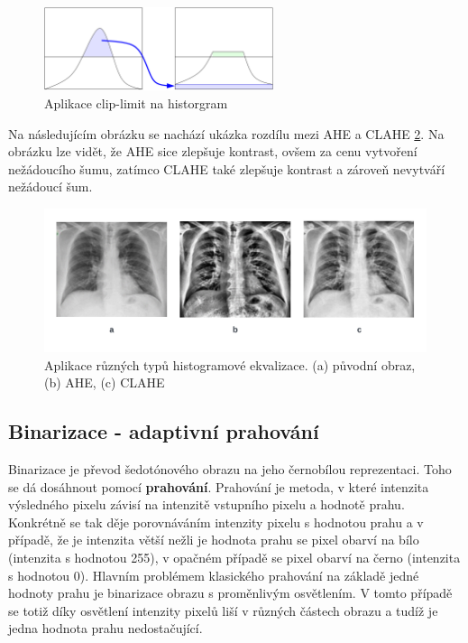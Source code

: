 \begin{figure}[h]
	\centering
	\includegraphics[width=0.6\textwidth]{obrazky/clip-limit.png}
	\caption{Aplikace clip-limit na historgram \cite{clip-limit}}
	\label{clip-limit}
\end{figure}

Na následujícím obrázku se nachází ukázka rozdílu mezi AHE a CLAHE \ref{CLAHEvsAHE}. Na obrázku lze vidět, že AHE sice zlepšuje kontrast, ovšem za cenu vytvoření nežádoucího šumu, zatímco CLAHE také zlepšuje kontrast a zároveň nevytváří nežádoucí šum.

\newpage
\begin{figure}[h]
	\centering
	\includegraphics[width=1\textwidth]{obrazky/CLAHEvsAHE.png}
	\caption{Aplikace různých typů histogramové ekvalizace. (a) původní obraz, (b) AHE, (c) CLAHE \cite{9563980}}
	\label{CLAHEvsAHE}
\end{figure}


\subsection{Binarizace - adaptivní prahování}
\label{adaptivetresh_chapter}
Binarizace je převod šedotónového obrazu na jeho černobílou reprezentaci. Toho se dá dosáhnout pomocí \textbf{prahování}. Prahování je metoda, v které intenzita výsledného pixelu závisí na intenzitě vstupního pixelu a hodnotě prahu. Konkrétně se tak děje porovnáváním intenzity pixelu s hodnotou prahu a v případě, že je intenzita větší nežli je hodnota prahu se pixel obarví na bílo (intenzita s hodnotou 255), v opačném případě se pixel obarví na černo (intenzita s hodnotou 0). Hlavním problémem klasického prahování na základě jedné hodnoty prahu je binarizace obrazu s proměnlivým osvětlením. V tomto případě se totiž díky osvětlení intenzity pixelů liší v různých částech obrazu a tudíž je jedna hodnota prahu nedostačující.


